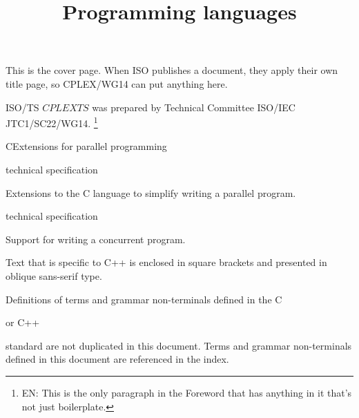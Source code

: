 \documentclass[
	techspec,	%
	final,		%
	notcopyright,	%
	letterpaper	%
	]{isov2}
\newcommand{\cplexts}{$CPLEXTS$}
\begin{document}
\begin{cover}
This is the cover page.
When ISO publishes a document, they apply their own title page,
so CPLEX/WG14 can put anything here.
\clearpage
\end{cover}


\begin{foreword}


ISO/TS
\cplexts{}
was prepared by Technical Committee ISO/IEC JTC1/SC22/WG14.%
\footnote{EN:
This is the only paragraph in the Foreword that has anything in it
that's not just boilerplate.
}

\fwdnopatents
\end{foreword}

\begin{introduction}
\intropatents
\end{introduction}

\title{Programming languages}{C}{Extensions for parallel programming}

\scopeclause
\begin{inscope}{technical specification}
\item
Extensions to the C language to simplify writing a parallel program.
\end{inscope}
\begin{outofscope}{technical specification}
\item
Support for writing a concurrent program.
\end{outofscope}

\normrefsclause
{}
\begin{nreferences}
\end{nreferences}




\pnum
\begin{cpp}
Text that is specific to C++
is enclosed in square brackets
and presented in oblique sans-serif type.
\end{cpp}

\pnum
Definitions of terms and grammar non-terminals defined in the C
\begin{cpp}
or C++
\end{cpp}
standard are not duplicated in this document.
Terms and grammar non-terminals defined in this document
are referenced in the index.
\end{document}
